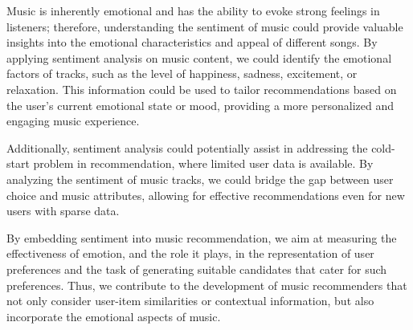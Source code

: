 Music is inherently emotional and has the ability to evoke strong feelings in listeners; therefore, understanding the sentiment of music could provide valuable insights into the emotional characteristics and appeal of different songs. By applying sentiment analysis on music content, we could identify the emotional factors of tracks, such as the level of happiness, sadness, excitement, or relaxation. This information could be used to tailor recommendations based on the user's current emotional state or mood, providing a more personalized and engaging music experience.

Additionally, sentiment analysis could potentially assist in addressing the cold-start problem in recommendation, where limited user data is available. By analyzing the sentiment of music tracks, we could bridge the gap between user choice and music attributes, allowing for effective recommendations even for new users with sparse data.

By embedding sentiment into music recommendation, we aim at measuring the effectiveness of emotion, and the role it plays, in the representation of user preferences and the task of generating suitable candidates that cater for such preferences. Thus, we contribute to the development of music recommenders that not only consider user-item similarities or contextual information, but also incorporate the emotional aspects of music.
